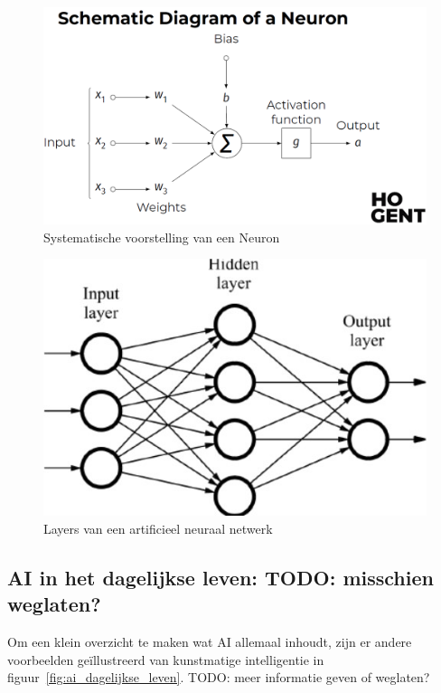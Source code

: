 \begin{figure}
    \centering
    \includegraphics[width=1\textwidth]{./img/neuron}
    \caption{\label{fig:neuron} Systematische voorstelling van een Neuron~\autocite{Lievens2021}}
\end{figure}

\begin{figure}
    \centering
    \includegraphics[width=.5\textwidth]{./img/layers}
    \caption{\label{fig:layers} Layers van een artificieel neuraal netwerk~\autocite{Lievens2021}}
\end{figure}

\subsection{AI in het dagelijkse leven: TODO: misschien weglaten?}
Om een klein overzicht te maken wat AI allemaal inhoudt, zijn er andere voorbeelden geïllustreerd van kunstmatige intelligentie in figuur~\ref{fig:ai_dagelijkse_leven}.
TODO: meer informatie geven of weglaten?


